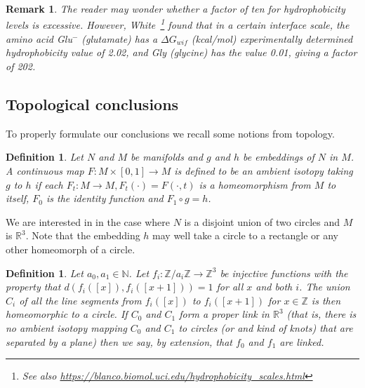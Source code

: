\documentclass{article}
\newtheorem{definition}[theorem]{Definition}
\newtheorem{remark}[theorem]{Remark}
\begin{document}
\begin{remark}
The reader may wonder whether a factor of ten for hydrophobicity levels is excessive.
However, White~\cite{white96}\footnote{See also \url{https://blanco.biomol.uci.edu/hydrophobicity_scales.html}} found that
in a certain \emph{interface scale}, the amino acid Glu$^-$ (glutamate)
has a $\Delta G_{wif}$ (kcal/mol) experimentally determined hydrophobicity value of 2.02, and Gly (glycine) has the value 0.01,
giving a factor of 202.
\end{remark}

\subsection{Topological conclusions}
To properly formulate our conclusions we recall some notions from topology.
\begin{definition}\label{isotopy}
Let $N$ and $M$ be manifolds and $g$ and $h$ be embeddings of $N$ in $M$.  A continuous map 
$F:M \times [0,1] \rightarrow M $ 
is defined to be an \emph{ambient isotopy} taking $g$ to $h$ if
each $F_t: M \rightarrow M, F_t(\cdot) = F(\cdot, t)$ is a homeomorphism from $M$ to itself,
$F_0$ is the identity function and $F_1 \circ g = h$.
\end{definition}
We are interested in  in the case where $N$ is a disjoint union of two circles and $M$ is $\mathbb R^3$.
Note that the embedding $h$ may well take a circle to a rectangle or any other homeomorph of a circle.

\begin{definition}
	Let $a_0,a_1\in \mathbb N$.
	Let $f_i:\mathbb Z/a_i\mathbb Z\to\mathbb Z^3$ be injective functions with the property that
	$d(f_{i}([x]),f_{i}([x+1]))=1$ for all $x$ and both $i$.
	The union $C_i$ of all the line segments from $f_{i}([x])$ to $f_{i}([x+1])$ for $x\in\mathbb Z$ is then homeomorphic to a circle.
	If $C_0$ and $C_1$ form a proper link in $\mathbb R^3$
	(that is, there is no ambient isotopy mapping $C_0$ and $C_1$ to circles (or and kind of knots) that are separated by a plane)
	then we say, by extension, that $f_0$ and $f_1$ are \emph{linked}.
\end{definition}
\end{document}
